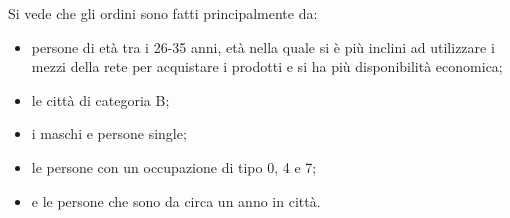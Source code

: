 \documentclass{article}
\begin{document}
\begin{figure}[htp!]
\centering
{}
\end{figure}

Si vede che gli ordini sono fatti principalmente da:
\begin{itemize}
\item persone di età tra i 26-35 anni, età nella quale si è più inclini ad utilizzare i mezzi della rete per acquistare i prodotti e si ha più disponibilità economica;
\item le città di categoria B;
\item i maschi e persone single;
\item le persone con un occupazione di tipo 0, 4 e 7;
\item e le persone che sono da circa un anno in città.
\end{itemize}
\end{document}
